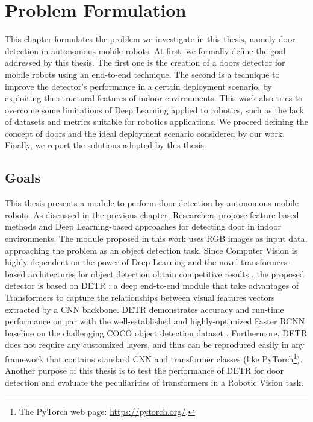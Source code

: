 \chapter{Problem Formulation}
\label{sec:chapter3}
\thispagestyle{empty}

This chapter formulates the problem we investigate in this thesis, namely door detection in autonomous mobile robots.  At first, we formally define the goal addressed by this thesis. The first one is the creation of a doors detector for mobile robots using an end-to-end technique. The second is a technique to improve the detector's performance in a certain deployment scenario, by exploiting the structural features of indoor environments. This work also tries to overcome some limitations of Deep Learning applied to robotics, such as the lack of datasets and metrics suitable for robotics applications. We proceed defining the concept of doors and the ideal deployment scenario considered by our work. Finally, we report the solutions adopted by this thesis.

\section{Goals}
\label{sec:goals}
This thesis presents a module to perform door detection by autonomous mobile robots. As discussed in the previous chapter, Researchers propose feature-based methods \cite{sonarandivisualdoordetection, humanoid, edgeandcornerdoorsdetector} and Deep Learning-based approaches \cite{detectdoorsfeature, doorsandnavigation, doorcabinet} for detecting door in indoor environments.  The module proposed in this work uses RGB images as input data, approaching the problem as an object detection task. Since Computer Vision is highly dependent on the power of Deep Learning \cite{deeplearningoverview} and the novel transformers-based architectures for object detection obtain competitive results \cite{surveytransformer}, the proposed detector is based on DETR \cite{detr}: a deep end-to-end module that take advantages of Transformers to capture the relationships between visual features vectors extracted by a CNN backbone. DETR demonstrates accuracy and run-time performance on par with the well-established and highly-optimized Faster RCNN \cite{fasterrcnn} baseline on the challenging COCO object detection dataset \cite{coco}. Furthermore, DETR does not require any customized layers, and thus can be reproduced easily in any framework that contains standard CNN and transformer classes (like PyTorch\footnote{The PyTorch web page: \url{https://pytorch.org/}.}). Another purpose of this thesis is to test the performance of DETR for door detection and evaluate the peculiarities of transformers in a Robotic Vision task.

